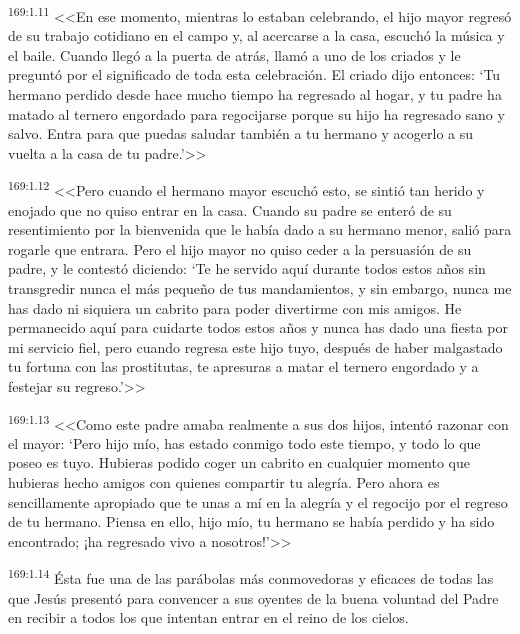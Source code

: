 \par 
\textsuperscript{169:1.11} <<En ese momento, mientras lo estaban celebrando, el hijo mayor regresó de su trabajo cotidiano en el campo y, al acercarse a la casa, escuchó la música y el baile. Cuando llegó a la puerta de atrás, llamó a uno de los criados y le preguntó por el significado de toda esta celebración. El criado dijo entonces: `Tu hermano perdido desde hace mucho tiempo ha regresado al hogar, y tu padre ha matado al ternero engordado para regocijarse porque su hijo ha regresado sano y salvo. Entra para que puedas saludar también a tu hermano y acogerlo a su vuelta a la casa de tu padre.'>>

\par 
\textsuperscript{169:1.12} <<Pero cuando el hermano mayor escuchó esto, se sintió tan herido y enojado que no quiso entrar en la casa. Cuando su padre se enteró de su resentimiento por la bienvenida que le había dado a su hermano menor, salió para rogarle que entrara. Pero el hijo mayor no quiso ceder a la persuasión de su padre, y le contestó diciendo: `Te he servido aquí durante todos estos años sin transgredir nunca el más pequeño de tus mandamientos, y sin embargo, nunca me has dado ni siquiera un cabrito para poder divertirme con mis amigos. He permanecido aquí para cuidarte todos estos años y nunca has dado una fiesta por mi servicio fiel, pero cuando regresa este hijo tuyo, después de haber malgastado tu fortuna con las prostitutas, te apresuras a matar el ternero engordado y a festejar su regreso.'>>

\par 
\textsuperscript{169:1.13} <<Como este padre amaba realmente a sus dos hijos, intentó razonar con el mayor: `Pero hijo mío, has estado conmigo todo este tiempo, y todo lo que poseo es tuyo. Hubieras podido coger un cabrito en cualquier momento que hubieras hecho amigos con quienes compartir tu alegría. Pero ahora es sencillamente apropiado que te unas a mí en la alegría y el regocijo por el regreso de tu hermano. Piensa en ello, hijo mío, tu hermano se había perdido y ha sido encontrado; ¡ha regresado vivo a nosotros!'>>

\par 
\textsuperscript{169:1.14} Ésta fue una de las parábolas más conmovedoras y eficaces de todas las que Jesús presentó para convencer a sus oyentes de la buena voluntad del Padre en recibir a todos los que intentan entrar en el reino de los cielos.

